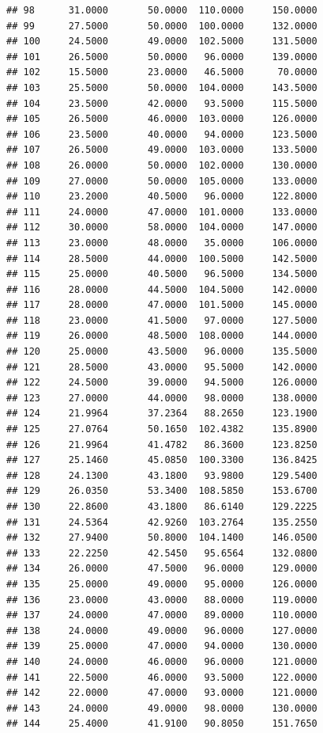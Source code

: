 \documentclass[]{article}
\begin{document}
\begin{verbatim}
## 98      31.0000       50.0000  110.0000     150.0000
## 99      27.5000       50.0000  100.0000     132.0000
## 100     24.5000       49.0000  102.5000     131.5000
## 101     26.5000       50.0000   96.0000     139.0000
## 102     15.5000       23.0000   46.5000      70.0000
## 103     25.5000       50.0000  104.0000     143.5000
## 104     23.5000       42.0000   93.5000     115.5000
## 105     26.5000       46.0000  103.0000     126.0000
## 106     23.5000       40.0000   94.0000     123.5000
## 107     26.5000       49.0000  103.0000     133.5000
## 108     26.0000       50.0000  102.0000     130.0000
## 109     27.0000       50.0000  105.0000     133.0000
## 110     23.2000       40.5000   96.0000     122.8000
## 111     24.0000       47.0000  101.0000     133.0000
## 112     30.0000       58.0000  104.0000     147.0000
## 113     23.0000       48.0000   35.0000     106.0000
## 114     28.5000       44.0000  100.5000     142.5000
## 115     25.0000       40.5000   96.5000     134.5000
## 116     28.0000       44.5000  104.5000     142.0000
## 117     28.0000       47.0000  101.5000     145.0000
## 118     23.0000       41.5000   97.0000     127.5000
## 119     26.0000       48.5000  108.0000     144.0000
## 120     25.0000       43.5000   96.0000     135.5000
## 121     28.5000       43.0000   95.5000     142.0000
## 122     24.5000       39.0000   94.5000     126.0000
## 123     27.0000       44.0000   98.0000     138.0000
## 124     21.9964       37.2364   88.2650     123.1900
## 125     27.0764       50.1650  102.4382     135.8900
## 126     21.9964       41.4782   86.3600     123.8250
## 127     25.1460       45.0850  100.3300     136.8425
## 128     24.1300       43.1800   93.9800     129.5400
## 129     26.0350       53.3400  108.5850     153.6700
## 130     22.8600       43.1800   86.6140     129.2225
## 131     24.5364       42.9260  103.2764     135.2550
## 132     27.9400       50.8000  104.1400     146.0500
## 133     22.2250       42.5450   95.6564     132.0800
## 134     26.0000       47.5000   96.0000     129.0000
## 135     25.0000       49.0000   95.0000     126.0000
## 136     23.0000       43.0000   88.0000     119.0000
## 137     24.0000       47.0000   89.0000     110.0000
## 138     24.0000       49.0000   96.0000     127.0000
## 139     25.0000       47.0000   94.0000     130.0000
## 140     24.0000       46.0000   96.0000     121.0000
## 141     22.5000       46.0000   93.5000     122.0000
## 142     22.0000       47.0000   93.0000     121.0000
## 143     24.0000       49.0000   98.0000     130.0000
## 144     25.4000       41.9100   90.8050     151.7650

\end{verbatim}
\end{document}
